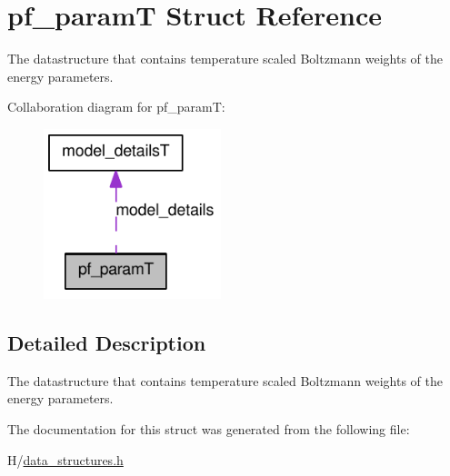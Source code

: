 \hypertarget{structpf__paramT}{
\section{pf\_\-paramT Struct Reference}
\label{structpf__paramT}
}


The datastructure that contains temperature scaled Boltzmann weights of the energy parameters.  




Collaboration diagram for pf\_\-paramT:\nopagebreak
\begin{figure}[H]
\begin{center}
\leavevmode
\includegraphics[width=146pt]{structpf__paramT__coll__graph}
\end{center}
\end{figure}


\subsection{Detailed Description}
The datastructure that contains temperature scaled Boltzmann weights of the energy parameters. 

The documentation for this struct was generated from the following file:\begin{DoxyCompactItemize}
\item 
H/\hyperlink{data__structures_8h}{data\_\-structures.h}\end{DoxyCompactItemize}
